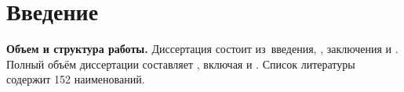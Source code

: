 \chapter*{Введение}                         %

\newcommand{\actuality}{}
\newcommand{\progress}{\textbf{\progressTXT}}
\newcommand{\objectresearch}{\textbf{\objectresearchTXT}}
\newcommand{\subjectresearch}{\textbf{\subjectresearchTXT}}
\newcommand{\aim}{\textbf{\aimTXT}}
\newcommand{\tasks}{\textbf{\tasksTXT}}
\newcommand{\novelty}{\textbf{\noveltyTXT}}
\newcommand{\fieldresearch}{\textbf{\fieldresearchTXT}}
\newcommand{\influence}{\textbf{\influenceTXT}}
\newcommand{\elaboration}{\textbf{\elaborationTXT}}
\newcommand{\methods}{\textbf{\methodsTXT}}
\newcommand{\defpositions}{\textbf{\defpositionsTXT}}

\newcommand{\reliability}{\textbf{\reliabilityTXT}}
\newcommand{\probation}{\textbf{\probationTXT}}
\newcommand{\contribution}{\textbf{\contributionTXT}}
\newcommand{\publications}{\textbf{\publicationsTXT}}


\textbf{Объем и структура работы.} Диссертация состоит из~введения,
,
заключения и
.
%
Полный объём диссертации составляет
, включая
 и
.
Список литературы содержит 152 наименований.


